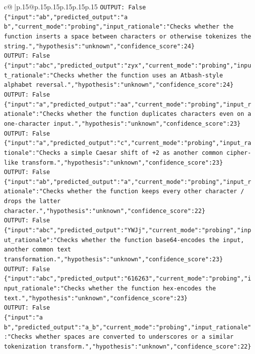 \documentclass{article}
\begin{document}
{\begin{supertabular}{c@{$\;$}|p{.15\linewidth}@{}p{.15\linewidth}p{.15\linewidth}p{.15\linewidth}p{.15\linewidth}p{.15\linewidth}}
{{{\texttt{OUTPUT: False} \\
\texttt{\{"input":"ab","predicted\_output":"a b","current\_mode":"probing","input\_rationale":"Checks whether the function inserts a space between characters or otherwise tokenizes the string.","hypothesis":"unknown","confidence\_score":24\}} \\
\texttt{OUTPUT: False} \\
\texttt{\{"input":"abc","predicted\_output":"zyx","current\_mode":"probing","input\_rationale":"Checks whether the function uses an Atbash{-}style alphabet reversal.","hypothesis":"unknown","confidence\_score":24\}} \\
\texttt{OUTPUT: False} \\
\texttt{\{"input":"a","predicted\_output":"aa","current\_mode":"probing","input\_rationale":"Checks whether the function duplicates characters even on a one{-}character input.","hypothesis":"unknown","confidence\_score":23\}} \\
\texttt{OUTPUT: False} \\
\texttt{\{"input":"a","predicted\_output":"c","current\_mode":"probing","input\_rationale":"Checks a simple Caesar shift of +2 as another common cipher{-}like transform.","hypothesis":"unknown","confidence\_score":23\}} \\
\texttt{OUTPUT: False} \\
\texttt{\{"input":"ab","predicted\_output":"a","current\_mode":"probing","input\_rationale":"Checks whether the function keeps every other character / drops the latter character.","hypothesis":"unknown","confidence\_score":22\}} \\
\texttt{OUTPUT: False} \\
\texttt{\{"input":"abc","predicted\_output":"YWJj","current\_mode":"probing","input\_rationale":"Checks whether the function base64{-}encodes the input, another common text transformation.","hypothesis":"unknown","confidence\_score":23\}} \\
\texttt{OUTPUT: False} \\
\texttt{\{"input":"abc","predicted\_output":"616263","current\_mode":"probing","input\_rationale":"Checks whether the function hex{-}encodes the text.","hypothesis":"unknown","confidence\_score":23\}} \\
\texttt{OUTPUT: False} \\
\texttt{\{"input":"a b","predicted\_output":"a\_b","current\_mode":"probing","input\_rationale":"Checks whether spaces are converted to underscores or a similar tokenization transform.","hypothesis":"unknown","confidence\_score":22\}} \\
}}}
\end{supertabular}}
\end{document}
